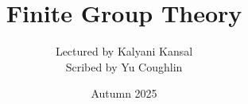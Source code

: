 \documentclass{article}
\begin{document}
\title{Finite Group Theory}
\author{Lectured by Kalyani Kansal \\
Scribed by Yu Coughlin}
\date{Autumn 2025}

\maketitle

\tableofcontents
\end{document}
